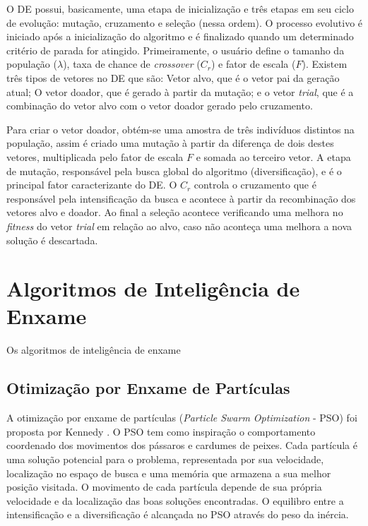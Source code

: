 O DE possui, basicamente, uma etapa de inicialização e três etapas em seu ciclo de evolução: mutação, cruzamento e seleção (nessa ordem). O processo evolutivo é iniciado após a inicialização do algoritmo e é finalizado quando um determinado critério de parada for atingido. Primeiramente, o usuário define o tamanho da população ($\lambda$), taxa de chance de \textit{crossover} ($C_r$) e fator de escala ($F$). Existem três tipos de vetores no DE que são: Vetor alvo, que é o vetor pai da geração atual; O vetor doador, que é gerado à partir da mutação; e o vetor \textit{trial}, que é a combinação do vetor alvo com o vetor doador gerado pelo cruzamento. 

Para criar o vetor doador, obtém-se uma amostra de três indivíduos distintos na população, assim é criado uma mutação à partir da diferença de dois destes vetores, multiplicada pelo fator de escala $F$ e somada ao terceiro vetor. A etapa de mutação, responsável pela busca global do algoritmo (diversificação), e é o principal fator caracterizante do DE. O $C_r$ controla o cruzamento que é responsável pela intensificação da busca e acontece à partir da recombinação dos vetores alvo e doador. Ao final a seleção acontece verificando uma melhora no \textit{fitness} do vetor \textit{trial} em relação ao alvo, caso não aconteça uma melhora a nova solução é descartada.

\section{Algoritmos de Inteligência de Enxame}
\label{sec:swarm_intelligence_algorithms}
Os algoritmos de inteligência de enxame

\subsection{Otimização por Enxame de Partículas}
\label{sec:particle_swarm_optimization}
A otimização por enxame de partículas (\textit{Particle Swarm Optimization} - PSO) foi proposta por Kennedy \cite{pso}. O PSO tem como inspiração o comportamento coordenado dos movimentos dos pássaros e cardumes de peixes. Cada partícula é uma solução potencial para o problema, representada por sua velocidade, localização no espaço de busca e uma memória que armazena a sua melhor posição visitada. O movimento de cada partícula depende de sua própria velocidade e da localização das boas soluções encontradas. O equilibro entre a intensificação e a diversificação é alcançada no PSO através do peso da inércia.

